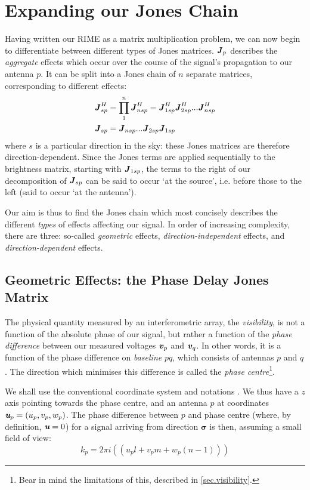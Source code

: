 \section{Expanding our Jones Chain}
\label{section.RIME.JonesChain}
\pg
Having written our RIME as a matrix multiplication problem, we can now begin to differentiate between different types of Jones matrices. $\Jones_p$ describes the \emph{aggregate} effects which occur over the course of the signal's propagation to our antenna $p$. It can be split into a Jones chain of $n$ separate matrices, corresponding to different effects:
\begin{align}
\displaystyle \Jones_{sp}^H &= \prod_1^n \Jones_{nsp}^H = \Jones_{1sp}^H \Jones_{2sp}^H ... \Jones_{nsp}^H\\
\displaystyle \Jones_{sp}   &= \Jones_{nsp}...\Jones_{2sp} \Jones_{1sp}
\end{align}
where $s$ is a particular direction in the sky: these Jones matrices are therefore direction-dependent.
Since the Jones terms are applied sequentially to the brightness matrix, starting with $\Jones_{1sp}$, the terms to the right of our decomposition of $\Jones_{sp}$ can be said to occur `at the source', i.e. before those to the left (said to occur `at the antenna').

\pg
Our aim is thus to find the Jones chain which most concisely describes the different \emph{types} of effects affecting our signal. In order of increasing complexity, there are three: so-called \emph{geometric} effects, \emph{direction-independent} effects, and \emph{direction-dependent} effects.

\subsection{Geometric Effects: the Phase Delay Jones Matrix}
\label{section.RIME.JonesChain.Kjones}

\pg
The physical quantity measured by an interferometric array, the \emph{visibility}, is not a function of the absolute phase of our signal, but rather a function of the \emph{phase difference} between our measured voltages $\volt_p$ and $\volt_q$. In other words, it is a function of the phase difference on \emph{baseline} $pq$, which consists of antennas $p$ and $q$. The direction which minimises this difference is called the \emph{phase centre}\footnote{Bear in mind the limitations of this, described in \cref{sec.visibility}.}.

\pg
We shall use the conventional coordinate system and notations . We thus have a $z$ axis pointing towards the phase centre, and an antenna $p$ at coordinates $\U_p=(u_p,v_p,w_p)$. The phase difference between $p$ and phase centre (where, by definition, $\U=0$) for a signal arriving from direction $\pmb{\sigma}$ is then, assuming a small field of view:
\begin{equation}
k_p=2\pi i (( u_p l + v_p m + w_p (n-1) ))
\end{equation}


